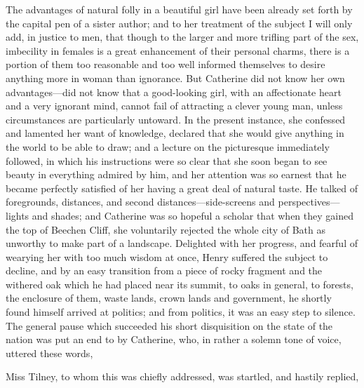The advantages of natural folly in a beautiful girl have been already set forth by the capital pen of a sister author; and to her treatment of the subject I will only add, in justice to men, that though to the larger and more trifling part of the sex, imbecility in females is a great enhancement of their personal charms, there is a portion of them too reasonable and too well informed themselves to desire anything more in woman than ignorance. But Catherine did not know her own advantages---did not know that a good-looking girl, with an affectionate heart and a very ignorant mind, cannot fail of attracting a clever young man, unless circumstances are particularly untoward. In the present instance, she confessed and lamented her want of knowledge, declared that she would give anything in the world to be able to draw; and a lecture on the picturesque immediately followed, in which his instructions were so clear that she soon began to see beauty in everything admired by him, and her attention was so earnest that he became perfectly satisfied of her having a great deal of natural taste. He talked of foregrounds, distances, and second distances---side-screens and perspectives---lights and shades; and Catherine was so hopeful a scholar that when they gained the top of Beechen Cliff, she voluntarily rejected the whole city of Bath as unworthy to make part of a landscape. Delighted with her progress, and fearful of wearying her with too much wisdom at once, Henry suffered the subject to decline, and by an easy transition from a piece of rocky fragment and the withered oak which he had placed near its summit, to oaks in general, to forests, the enclosure of them, waste lands, crown lands and government, he shortly found himself arrived at politics; and from politics, it was an easy step to silence. The general pause which succeeded his short disquisition on the state of the nation was put an end to by Catherine, who, in rather a solemn tone of voice, uttered these words, 

Miss Tilney, to whom this was chiefly addressed, was startled, and hastily replied, 




